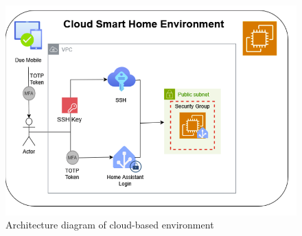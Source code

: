 \begin{figure}[H]
	\centering
	\includegraphics[width=0.8 \linewidth]{Images/K4/Picture42.png}
	\caption{Architecture diagram of cloud-based environment}
	\label{fig:cloud_arch}
\end{figure}

